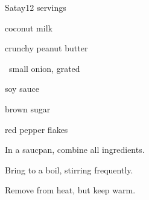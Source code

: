 \begin{recipe}{Satay}{}{12 servings}

\begin{ingredients}
\item {} coconut milk
\item \C{\half} crunchy peanut butter
\item \half{}~small onion, grated
\item {} soy sauce
\item {} brown sugar
\item \tp{\half} red pepper flakes
\end{ingredients}

\begin{directions}
\item In a saucpan, combine all ingredients.
\item Bring to a boil, stirring frequently.
\item Remove from heat, but keep warm.
\end{directions}

\end{recipe}
